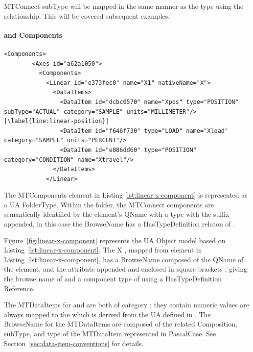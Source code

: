 MTConnect \gls{subType} will be mapped in the same manner as the type using the  relationship. This will be covered subsequent examples.

\FloatBarrier

\paragraph{ and  Components}

\begin{lstlisting}[firstnumber=last,escapechar=|,%
    caption={Components and Conditions},label={lst:linear-x-component}]
      <Components>
        <Axes id="a62a1050">
          <Components>
            <Linear id="e373fec0" name="X1" nativeName="X">
              <DataItems>
                <DataItem id="dcbc0570" name="Xpos" type="POSITION" subType="ACTUAL" category="SAMPLE" units="MILLIMETER"/> |\label{line:linear-position}|
                <DataItem id="f646f730" type="LOAD" name="Xload" category="SAMPLE" units="PERCENT"/>
                <DataItem id="e086dd60" type="POSITION" category="CONDITION" name="Xtravel"/>
              </DataItems>
            </Linear>
\end{lstlisting}

The \glspl{MTComponent} element in Listing \ref{lst:linear-x-component} is represented as a UA \gls{FolderType}. Within the folder, the MTConnect components are semantically identified by the element's \gls{QName} with a type with the suffix  appended, in this case the \gls{BrowseName}   has a \gls{HasTypeDefinition} relaton of . 



Figure~\ref{fig:linear-x-component} represents the UA Object model based on  Listing~\ref{lst:linear-x-component}. The  X , mapped from  element in Listing~\ref{lst:linear-x-component}, has a \gls{BrowseName} composed of the \gls{QName} of the element, and the  attribute appended and enclosed in square brackets \xml{[X]}, giving the browse name of  and a component type of  using a \gls{HasTypeDefinition} \gls{Reference}.

The \glspl{MTDataItem} for  and  are both of \gls{category} ; they contain numeric values are always mapped to the  which is derived from the UA  defined in \cite{UAPart8}. The \gls{BrowseName} for the \glspl{MTDataItem} are composed of the related \gls{Composition}, \gls{subType}, and \gls{type} of the \gls{MTDataItem} represented in \gls{PascalCase}. See Section~\ref{sec:data-item-conventions} for details.

